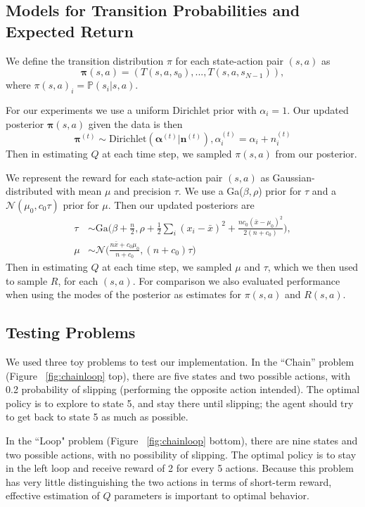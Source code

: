 \documentclass[10pt, twocolumn, twoside]{article}
\begin{document}
\subsection{Models for Transition Probabilities and Expected Return}
We define the transition distribution $\pi$ for each state-action pair $(s, a)$ as
\begin{equation*}
\mathbf{\pi}(s, a) = (T(s, a, s_0), ..., T(s, a, s_{N-1})),
\end{equation*}
where $\pi(s, a)_i = \mathbb{P}(s_i| s, a)$.

For our experiments we use a uniform Dirichlet prior with $\alpha_i = 1$.
Our updated posterior $\mathbf{\pi}(s, a)$ given the data is then
\begin{equation*}
\mathbf{\pi}^{(t)} \sim \textrm{Dirichlet}(\mathbf{\alpha}^{(t)}| \mathbf{n}^{(t)}),
\alpha^{(t)}_i = \alpha_i + n_i^{(t)}
\end{equation*}
Then in estimating $Q$ at each time step, we sampled $\pi(s, a)$ from our posterior.

We represent the reward for each state-action pair $(s, a)$ as Gaussian-
distributed with mean $\mu$ and precision $\tau$. We use a Ga($\beta,\rho$)
prior for $\tau$ and a $\mathcal{N}(\mu_0, c_0\tau)$ prior for $\mu$. Then our
updated posteriors are
\begin{align*}
\tau &\sim \textrm{Ga}\Big(\beta + \frac{n}{2}, \rho + \frac{1}{2}\sum_i(x_i - \bar{x})^2
+ \frac{nc_0(\bar{x}-\mu_0)^2}{2(n+c_0)}\Big),\\
\mu &\sim \mathcal{N}\Big(\frac{n\bar{x} + c_0\mu_0}{n + c_0}, (n+c_0)\tau\Big)
\end{align*}
Then in estimating $Q$ at each time step, we sampled $\mu$ and $\tau$, which we then used
to sample $R$, for each $(s, a)$.
For comparison we also evaluated performance when using the modes of the posterior as
estimates for $\pi(s, a)$ and $R(s,a)$.

\subsection{Testing Problems}
We used three toy problems to test our implementation. In the ``Chain'' problem
(Figure ~\ref{fig:chainloop} top), there are five states and two possible actions, with 0.2
probability of slipping (performing the opposite action intended). The optimal
policy is to explore to state 5, and stay there until slipping; the agent should try
to get back to state 5 as much as possible.

In the ``Loop" problem (Figure ~\ref{fig:chainloop} bottom), there are nine states and
two possible actions, with no possibility of slipping. The optimal policy is to stay
in the left loop and receive reward of 2 for every 5 actions. Because this problem has
very little distinguishing the two actions in terms of short-term reward, effective
estimation of $Q$ parameters is important to optimal behavior.
\end{document}
